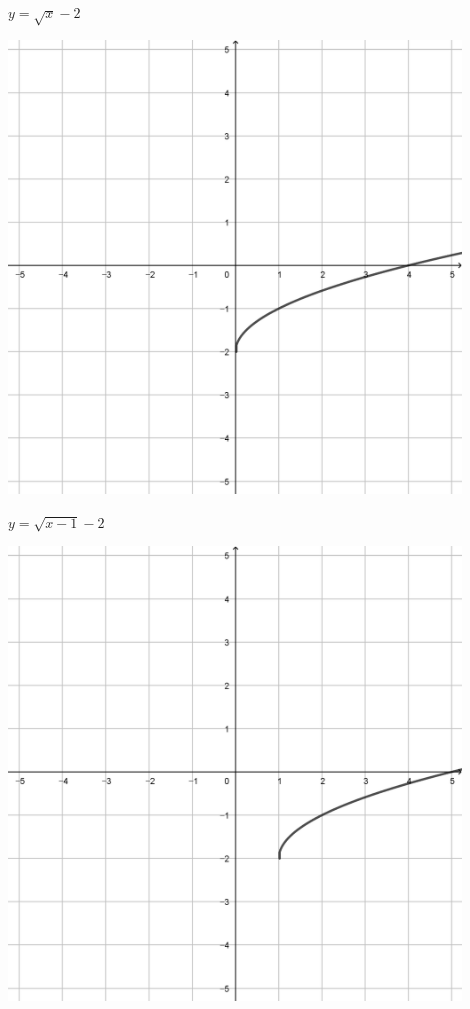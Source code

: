 \documentclass[a4paper]{oblivoir}
\begin{document}
\begin{minipage}{0.45\textwidth}\centering
\(y=\sqrt{x}-2\)
\par\bigskip\includegraphics[width=0.9\textwidth]{img/23-3}
\end{minipage}
\begin{minipage}{0.45\textwidth}\centering
\(y=\sqrt{x-1}-2\)
\par\bigskip\includegraphics[width=0.9\textwidth]{img/23-4}
\end{minipage}\bigskip\bigskip\par
\end{document}
